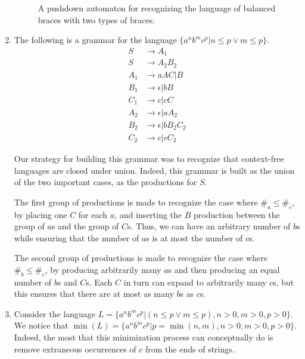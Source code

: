 \documentclass[letterpaper,11pt]{article}
\begin{document}
\begin{enumerate}
\begin{figure}
            \caption{
                A pushdown automaton for recognizing the language of balanced
                braces with two types of braces.
            }

            \label{fig:pda}
        \end{figure}

    \item
        The following is a grammar for the language
        $\{a^n b^m c^p | n \leq p \lor m \leq p\}$.
        \begin{align*}
            S &\to A_1 \\
            S &\to A_2 B_2 \\
            A_1 &\to a A C | B \\
            B_1 &\to \epsilon | b B \\
            C_1 &\to c | c C \\
            A_2 &\to \epsilon | a A_2 \\
            B_2 &\to \epsilon | b B_2 C_2 \\
            C_2 &\to c | c C_2
        \end{align*}

        Our strategy for building this grammar was to recognize that
        context-free languages are closed under union. Indeed, this grammar is
        built as the union of the two important cases, as the productions for
        $S$.

        The first group of productions is made to recognize the case where
        $\#_a \leq \#_c$, by placing one $C$ for each $a$, and inserting the
        $B$ production between the group of $a$s and the group of $C$s. Thus,
        we can have an arbitrary number of $b$s while ensuring that the number
        of $a$s is at most the number of $c$s.

        The second group of productions is made to recognize the case where
        $\#_b \leq \#_c$, by producing arbitrarily many $a$s and then producing
        an equal number of $b$s and $C$s. Each $C$ in turn can expand to
        arbitrarily many $c$s, but this ensures that there are at most as many
        $b$s as $c$s.

    \item
        Consider the language
        $L = \{a^n b^m c^p | (n \leq p \lor m \leq p), n > 0, m > 0, p > 0\}$.
        We notice that
        $\min{(L)} = \{a^n b^m c^p | p = \min{(n, m)}, n > 0, m > 0, p > 0\}$.
        Indeed, the most that this minimization process can conceptually do is
        remove extraneous occurrences of $c$ from the ends of strings.


\end{enumerate}
\end{document}
